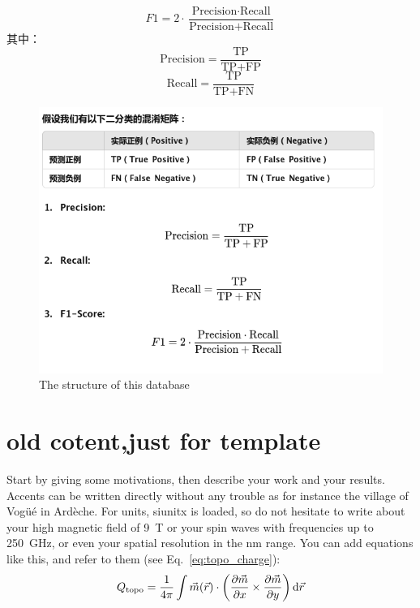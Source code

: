 \documentclass[a4paper, 10pt]{article}
\begin{document}
\[
	F1 = 2 \cdot \frac{\text{Precision} \cdot \text{Recall}}{\text{Precision} + \text{Recall}}
\]
其中：
\[
	\text{Precision} = \frac{\text{TP}}{\text{TP} + \text{FP}}
\]
\[
	\text{Recall} = \frac{\text{TP}}{\text{TP} + \text{FN}}
\]

\begin{figure}[ht]
	\centering
	\begin{minipage}{0.8\textwidth}%
		\includegraphics[width=15cm]{F1.jpg}
		\caption{The structure of this database}
		\label{fig:F1score}
	\end{minipage}
\end{figure}






\section{old cotent,just for template}
Start by giving some motivations, then describe your work and your results. Accents can be written directly without any trouble as for instance the village of Vogüé in Ardèche. For units, siunitx is loaded, so do not hesitate to write about your high magnetic field of \SI{9}{\tesla} or your spin waves with frequencies up to \SI{250}{\GHz}, or even your spatial resolution in the \si{\nano\meter} range. You can add equations like this, and refer to them (see Eq.~\ref{eq:topo_charge}):
\begin{equation}
	\label{eq:topo_charge}
	Q_\text{topo} = \frac{1}{4\pi} \int \vec{m}(\vec{r}) \cdot \left (\pdv{\vec{m}}{x} \times \pdv{\vec{m}}{y} \right) \dd{\vec{r}}
\end{equation}
\end{document}
